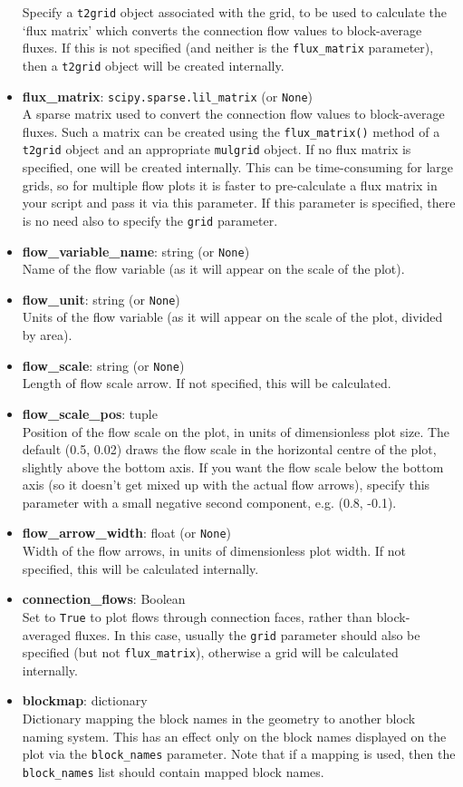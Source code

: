 \begin{itemize}
  Specify a \texttt{t2grid} object associated with the grid, to be used to calculate the `flux matrix' which converts the connection flow values to block-average fluxes.  If this is not specified (and neither is the \texttt{flux\_matrix} parameter), then a \texttt{t2grid} object will be created internally.
\item \textbf{flux\_matrix}: \texttt{scipy.sparse.lil\_matrix} (or \texttt{None})\\
  A sparse matrix used to convert the connection flow values to block-average fluxes.  Such a matrix can be created using the \texttt{flux\_matrix()} method of a \texttt{t2grid} object and an appropriate \texttt{mulgrid} object.  If no flux matrix is specified, one will be created internally.  This can be time-consuming for large grids, so for multiple flow plots it is faster to pre-calculate a flux matrix in your script and pass it via this parameter.  If this parameter is specified, there is no need also to specify the \texttt{grid} parameter.
\item \textbf{flow\_variable\_name}: string (or \texttt{None})\\
  Name of the flow variable (as it will appear on the scale of the plot).
\item \textbf{flow\_unit}: string (or \texttt{None})\\
  Units of the flow variable (as it will appear on the scale of the plot, divided by area).
\item \textbf{flow\_scale}: string (or \texttt{None})\\
  Length of flow scale arrow.  If not specified, this will be calculated.
\item \textbf{flow\_scale\_pos}: tuple\\
  Position of the flow scale on the plot, in units of dimensionless plot size.  The default (0.5, 0.02) draws the flow scale in the horizontal centre of the plot, slightly above the bottom axis.  If you want the flow scale below the bottom axis (so it doesn't get mixed up with the actual flow arrows), specify this parameter with a small negative second component, e.g. (0.8, -0.1).
\item \textbf{flow\_arrow\_width}: float (or \texttt{None})\\
  Width of the flow arrows, in units of dimensionless plot width.  If not specified, this will be calculated internally.
\item \textbf{connection\_flows}: Boolean\\
  Set to \texttt{True} to plot flows through connection faces, rather than block-averaged fluxes.  In this case, usually the \texttt{grid} parameter should also be specified (but not \texttt{flux\_matrix}), otherwise a grid will be calculated internally.
\item \textbf{blockmap}: dictionary\\
  Dictionary mapping the block names in the geometry to another block naming system. This has an effect only on the block names displayed on the plot via the \texttt{block\_names} parameter. Note that if a mapping is used, then the \texttt{block\_names} list should contain mapped block names.
\end{itemize}

